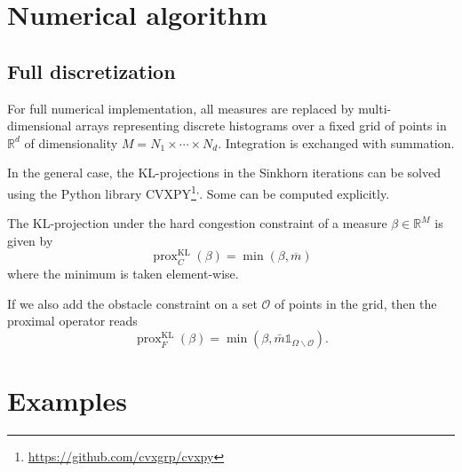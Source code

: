 \documentclass{article}
\newcommand{\RR}{\mathbb{R}}
\DeclareMathOperator{\KL}{KL}
\DeclareMathOperator{\prox}{prox}
\begin{document}
\section{Numerical algorithm}




\subsection{Full discretization}

For full numerical implementation, all measures are replaced by multi-dimensional arrays representing discrete histograms over a fixed grid of points in $\RR^d$ of dimensionality $M = N_1\times\cdots\times N_d$. Integration is exchanged with summation.

In the general case, the KL-projections in the Sinkhorn iterations can be solved using the Python library CVXPY\footnote{\url{https://github.com/cvxgrp/cvxpy}}\textsuperscript{,}. Some can be computed explicitly.


\begin{remark}
   	The KL-projection under the hard congestion constraint of a measure $\beta\in\RR^M$ is given by
   	\begin{equation}
   		\prox^{\KL} _C(\beta) = \min(\beta,\overline{m})
   	\end{equation}
   	where the minimum is taken element-wise.
   	
   	If we also add the obstacle constraint on a set $\mathscr{O}$ of points in the grid, then the proximal operator reads
   	\begin{equation}
   		\prox^{\KL}_F(\beta) = \min(\beta, \bar{m}\mathds{1}_{\Omega\backslash\mathscr{O}}).
   	\end{equation}
\end{remark}



\section{Examples}






\printbibliography{}
\end{document}
